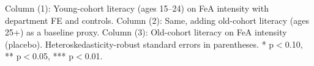 \begin{table}[htbp]
   \par \raggedright \footnotesize
   Column (1): Young-cohort literacy (ages 15--24) on FeA intensity with department FE and controls.
   Column (2): Same, adding old-cohort literacy (ages 25+) as a baseline proxy.
   Column (3): Old-cohort literacy on FeA intensity (placebo).
   Heteroskedasticity-robust standard errors in parentheses.
   * p$<$0.10, ** p$<$0.05, *** p$<$0.01.
\end{table}


